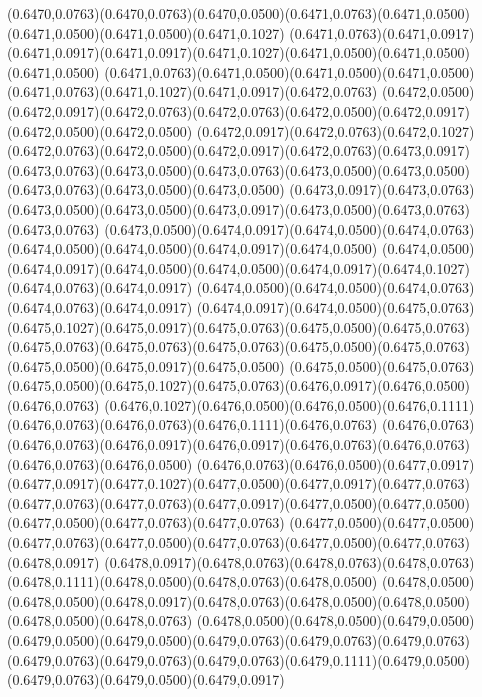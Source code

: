 (0.6470,0.0763)(0.6470,0.0763)(0.6470,0.0500)(0.6471,0.0763)(0.6471,0.0500)(0.6471,0.0500)(0.6471,0.0500)(0.6471,0.1027)
(0.6471,0.0763)(0.6471,0.0917)(0.6471,0.0917)(0.6471,0.0917)(0.6471,0.1027)(0.6471,0.0500)(0.6471,0.0500)(0.6471,0.0500)
(0.6471,0.0763)(0.6471,0.0500)(0.6471,0.0500)(0.6471,0.0500)(0.6471,0.0763)(0.6471,0.1027)(0.6471,0.0917)(0.6472,0.0763)
(0.6472,0.0500)(0.6472,0.0917)(0.6472,0.0763)(0.6472,0.0763)(0.6472,0.0500)(0.6472,0.0917)(0.6472,0.0500)(0.6472,0.0500)
(0.6472,0.0917)(0.6472,0.0763)(0.6472,0.1027)(0.6472,0.0763)(0.6472,0.0500)(0.6472,0.0917)(0.6472,0.0763)(0.6473,0.0917)
(0.6473,0.0763)(0.6473,0.0500)(0.6473,0.0763)(0.6473,0.0500)(0.6473,0.0500)(0.6473,0.0763)(0.6473,0.0500)(0.6473,0.0500)
(0.6473,0.0917)(0.6473,0.0763)(0.6473,0.0500)(0.6473,0.0500)(0.6473,0.0917)(0.6473,0.0500)(0.6473,0.0763)(0.6473,0.0763)
(0.6473,0.0500)(0.6474,0.0917)(0.6474,0.0500)(0.6474,0.0763)(0.6474,0.0500)(0.6474,0.0500)(0.6474,0.0917)(0.6474,0.0500)
(0.6474,0.0500)(0.6474,0.0917)(0.6474,0.0500)(0.6474,0.0500)(0.6474,0.0917)(0.6474,0.1027)(0.6474,0.0763)(0.6474,0.0917)
(0.6474,0.0500)(0.6474,0.0500)(0.6474,0.0763)(0.6474,0.0763)(0.6474,0.0917)
\PST@Solid(0.6474,0.0917)(0.6474,0.0500)(0.6475,0.0763)(0.6475,0.1027)(0.6475,0.0917)(0.6475,0.0763)(0.6475,0.0500)(0.6475,0.0763)
(0.6475,0.0763)(0.6475,0.0763)(0.6475,0.0763)(0.6475,0.0500)(0.6475,0.0763)(0.6475,0.0500)(0.6475,0.0917)(0.6475,0.0500)
(0.6475,0.0500)(0.6475,0.0763)(0.6475,0.0500)(0.6475,0.1027)(0.6475,0.0763)(0.6476,0.0917)(0.6476,0.0500)(0.6476,0.0763)
(0.6476,0.1027)(0.6476,0.0500)(0.6476,0.0500)(0.6476,0.1111)(0.6476,0.0763)(0.6476,0.0763)(0.6476,0.1111)(0.6476,0.0763)
(0.6476,0.0763)(0.6476,0.0763)(0.6476,0.0917)(0.6476,0.0917)(0.6476,0.0763)(0.6476,0.0763)(0.6476,0.0763)(0.6476,0.0500)
(0.6476,0.0763)(0.6476,0.0500)(0.6477,0.0917)(0.6477,0.0917)(0.6477,0.1027)(0.6477,0.0500)(0.6477,0.0917)(0.6477,0.0763)
(0.6477,0.0763)(0.6477,0.0763)(0.6477,0.0917)(0.6477,0.0500)(0.6477,0.0500)(0.6477,0.0500)(0.6477,0.0763)(0.6477,0.0763)
(0.6477,0.0500)(0.6477,0.0500)(0.6477,0.0763)(0.6477,0.0500)(0.6477,0.0763)(0.6477,0.0500)(0.6477,0.0763)(0.6478,0.0917)
(0.6478,0.0917)(0.6478,0.0763)(0.6478,0.0763)(0.6478,0.0763)(0.6478,0.1111)(0.6478,0.0500)(0.6478,0.0763)(0.6478,0.0500)
(0.6478,0.0500)(0.6478,0.0500)(0.6478,0.0917)(0.6478,0.0763)(0.6478,0.0500)(0.6478,0.0500)(0.6478,0.0500)(0.6478,0.0763)
(0.6478,0.0500)(0.6478,0.0500)(0.6479,0.0500)(0.6479,0.0500)(0.6479,0.0500)(0.6479,0.0763)(0.6479,0.0763)(0.6479,0.0763)
(0.6479,0.0763)(0.6479,0.0763)(0.6479,0.0763)(0.6479,0.1111)(0.6479,0.0500)(0.6479,0.0763)(0.6479,0.0500)(0.6479,0.0917)
